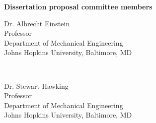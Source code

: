 \vspace{0.35in}
\centerline{\textbf{Dissertation proposal committee members}}

\begin{minipage}[t]{0.5\textwidth}
	\begin{flushleft}
	Dr. Albrecht Einstein \\
    Professor \\
    Department of Mechanical Engineering \\
    Johns Hopkins University, Baltimore, MD
	\end{flushleft}
\end{minipage}
~
\begin{minipage}[t]{0.5\textwidth}
	\begin{flushleft}
    Dr. Stewart Hawking \\
    Professor \\
    Department of Mechanical Engineering \\
    Johns Hopkins University, Baltimore, MD 
	\end{flushleft}
\end{minipage}












